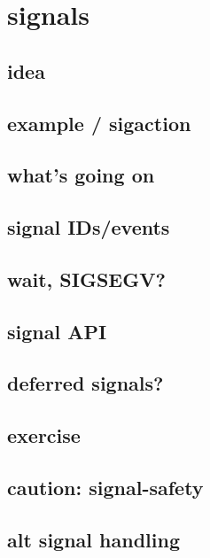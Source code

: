 \section{signals}

\subsection{idea}



\subsection{example / sigaction}



\subsection{what's going on}




\subsection{signal IDs/events}




\subsection{wait, SIGSEGV?}



\subsection{signal API}



\subsection{deferred signals?}


\subsection{exercise}


\subsection{caution: signal-safety}


\subsection{alt signal handling}


